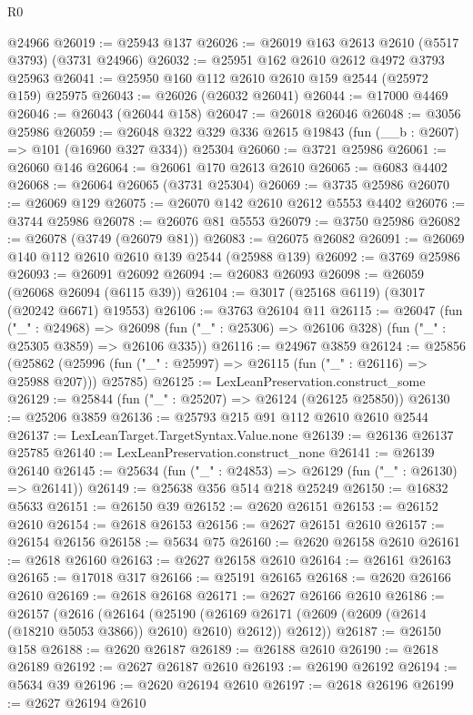 \begin{lexlean}{R0}
\begin{coremodule}
    @24966
@26019 := @25943 @137
@26026 := @26019 @163 @2613 @2610 (@5517 @3793) (@3731 @24966)
@26032 := @25951 @162 @2610 @2612 @4972 @3793 @25963
@26041 := @25950 @160 @112 @2610 @2610 @159 @2544 (@25972 @159) @25975
@26043 := @26026 (@26032 @26041)
@26044 := @17000 @4469
@26046 := @26043 (@26044 @158)
@26047 := @26018 @26046
@26048 := @3056 @25986
@26059 := @26048 @322 @329 @336 @2615 @19843 (fun (__b : @2607) => @101 (@16960 @327 @334)) @25304
@26060 := @3721 @25986
@26061 := @26060 @146
@26064 := @26061 @170 @2613 @2610
@26065 := @6083 @4402
@26068 := @26064 @26065 (@3731 @25304)
@26069 := @3735 @25986
@26070 := @26069 @129
@26075 := @26070 @142 @2610 @2612 @5553 @4402
@26076 := @3744 @25986
@26078 := @26076 @81 @5553
@26079 := @3750 @25986
@26082 := @26078 (@3749 (@26079 @81))
@26083 := @26075 @26082
@26091 := @26069 @140 @112 @2610 @2610 @139 @2544 (@25988 @139)
@26092 := @3769 @25986
@26093 := @26091 @26092
@26094 := @26083 @26093
@26098 := @26059 (@26068 @26094 (@6115 @39))
@26104 := @3017 (@25168 @6119) (@3017 (@20242 @6671) @19553)
@26106 := @3763 @26104 @11
@26115 := @26047
    (fun ("_" : @24968) =>
    @26098 (fun ("_" : @25306) => @26106 @328) (fun ("_" : @25305 @3859) => @26106 @335))
@26116 := @24967 @3859
@26124 := @25856
    (@25862 (@25996 (fun ("_" : @25997) => @26115 (fun ("_" : @26116) => @25988 @207))) @25785)
@26125 := LexLeanPreservation.construct_some
@26129 := @25844 (fun ("_" : @25207) => @26124 (@26125 @25850))
@26130 := @25206 @3859
@26136 := @25793 @215 @91 @112 @2610 @2610 @2544
@26137 := LexLeanTarget.TargetSyntax.Value.none
@26139 := @26136 @26137 @25785
@26140 := LexLeanPreservation.construct_none
@26141 := @26139 @26140
@26145 := @25634 (fun ("_" : @24853) => @26129 (fun ("_" : @26130) => @26141))
@26149 := @25638 @356 @514 @218 @25249
@26150 := @16832 @5633
@26151 := @26150 @39
@26152 := @2620 @26151
@26153 := @26152 @2610
@26154 := @2618 @26153
@26156 := @2627 @26151 @2610
@26157 := @26154 @26156
@26158 := @5634 @75
@26160 := @2620 @26158 @2610
@26161 := @2618 @26160
@26163 := @2627 @26158 @2610
@26164 := @26161 @26163
@26165 := @17018 @317
@26166 := @25191 @26165
@26168 := @2620 @26166 @2610
@26169 := @2618 @26168
@26171 := @2627 @26166 @2610
@26186 := @26157
    (@2616
      (@26164
        (@25190 (@26169 @26171 (@2609 (@2609 (@2614 (@18210 @5053 @3866)) @2610) @2610) @2612))
        @2612))
@26187 := @26150 @158
@26188 := @2620 @26187
@26189 := @26188 @2610
@26190 := @2618 @26189
@26192 := @2627 @26187 @2610
@26193 := @26190 @26192
@26194 := @5634 @39
@26196 := @2620 @26194 @2610
@26197 := @2618 @26196
@26199 := @2627 @26194 @2610

\end{coremodule}
\end{lexlean}
